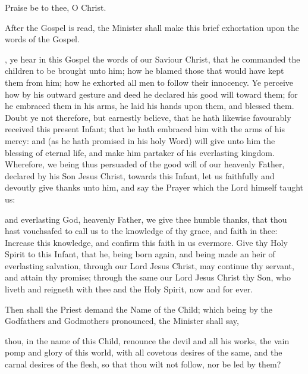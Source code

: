 \begin{leftbar}
 Praise be to thee, O Christ.
\end{leftbar}

\begin{rubric}
After the Gospel is read, the Minister shall make this brief exhortation upon the words of the Gospel.
\end{rubric}

, ye hear in this Gospel the words of our Saviour Christ, that he commanded the children to be brought unto him; how he blamed those that would have kept them from him; how he exhorted all men to follow their innocency.
Ye perceive how by his outward gesture and deed he declared his good will toward them; for he embraced them in his arms, he laid his hands upon them, and blessed them.
Doubt ye not therefore, but earnestly believe, that he hath likewise favourably received this present Infant; that he hath embraced him with the arms of his mercy: and (as he hath promised in his holy Word) will give unto him the blessing of eternal life, and make him partaker of his everlasting kingdom.
Wherefore, we being thus persuaded of the good will of our heavenly Father, declared by his Son Jesus Christ, towards this Infant, let us faithfully and devoutly give thanks unto him, and say the Prayer which the Lord himself taught us:



 and everlasting God, heavenly Father, we give thee humble thanks, that thou hast vouchsafed to call us to the knowledge of thy grace, and faith in thee: Increase this knowledge, and confirm this faith in us evermore.
Give thy Holy Spirit to this Infant, that he, being born again, and being made an heir of everlasting salvation, through our Lord Jesus Christ, may continue thy servant, and attain thy promise; through the same our Lord Jesus Christ thy Son, who liveth and reigneth with thee and the Holy Spirit, now and for ever.

\begin{rubric}
Then shall the Priest demand the Name of the Child; which being by the Godfathers and Godmothers pronounced, the Minister shall say,
\end{rubric}

 thou, in the name of this Child, renounce the devil and all his works, the vain pomp and glory of this world, with all covetous desires of the same, and the carnal desires of the flesh, so that thou wilt not follow, nor be led by them?


